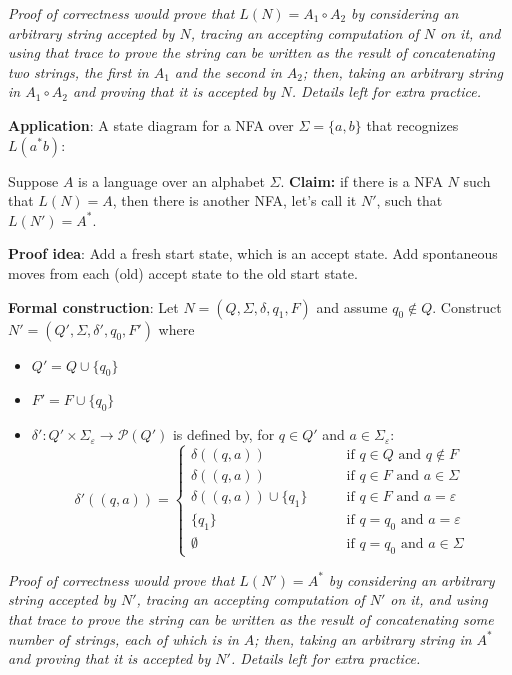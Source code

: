 \documentclass[12pt, oneside]{article}
\begin{document}
\vfill

{\it Proof of correctness would prove that $L(N) = A_1 \circ A_2$ by considering
an arbitrary string accepted by $N$, tracing an accepting computation of $N$ on it, and using 
that trace to prove the string can be written as the result of concatenating two strings, 
the first in $A_1$ and the second in $A_2$; then, taking an arbitrary 
string in $A_1 \circ A_2$ and proving that it is accepted by $N$. Details left for extra practice.}

\vfill
{\bf Application}: A state diagram for a NFA over $\Sigma = \{a,b\}$ 
that recognizes $L ( a^*b)$:


\newpage



Suppose $A$ is a language over an alphabet $\Sigma$.
{\bf Claim:} if there is a NFA $N$ such that $L(N) = A$, then there is another NFA, let's call it $N'$, such that 
$L(N') = A^*$.

{\bf Proof idea}: Add a fresh start state, which is an accept state. Add spontaneous 
moves from each (old) accept state to the old start state.

{\bf Formal construction}: Let 
$N = (Q, \Sigma, \delta, q_1, F)$ and assume $q_0 \notin Q$.
Construct $N' = (Q', \Sigma, \delta', q_0, F')$ where
\begin{itemize}
    \item $Q' = Q \cup \{q_0\}$
    \item $F' = F \cup \{q_0\}$
    \item $\delta': Q' \times \Sigma_\varepsilon \to \mathcal{P}(Q')$ is defined by, for $q \in Q'$ and $a \in \Sigma_{\varepsilon}$:
        \[
            \delta'((q,a))=\begin{cases}  
                \delta ((q,a)) &\qquad\text{if } q\in Q \textrm{ and } q \notin F\\ 
                \delta ((q,a)) &\qquad\text{if } q\in F \textrm{ and } a \in \Sigma\\ 
                \delta ((q,a)) \cup \{q_1\} &\qquad\text{if } q\in F \textrm{ and } a = \varepsilon\\ 
                \{q_1\} &\qquad\text{if } q = q_0 \textrm{ and } a = \varepsilon \\
                \emptyset &\qquad\text{if } q = q_0 \textrm { and } a \in \Sigma
            \end{cases}
        \]
\end{itemize}


{\it Proof of correctness would prove that $L(N') = A^*$ by considering
an arbitrary string accepted by $N'$, tracing an accepting computation of $N'$ on it, and using 
that trace to prove the string can be written as the result of concatenating some number of strings, 
each of which is in $A$; then, taking an arbitrary 
string in $A^*$ and proving that it is accepted by $N'$. Details left for extra practice.}
\end{document}

